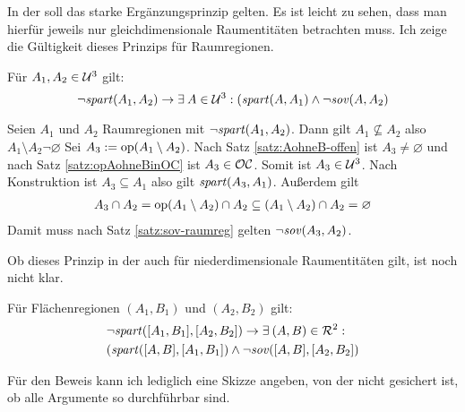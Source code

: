     In der \strukt soll das starke Ergänzungsprinzip gelten. 
    Es ist leicht zu sehen, dass man hierfür jeweils nur gleichdimensionale Raumentitäten betrachten muss.
    Ich zeige die Gültigkeit dieses Prinzips für Raumregionen.
    \begin{satz}
        Für $A_1,A_2 \in \mathcal{U}^3$ gilt: 
        $$\neg \mathit{spart}(A_1,A_2) \to \exists\: A \in  \mathcal{U}^3: (\mathit{spart}(A,A_1) \wedge \neg \mathit{sov}(A,A_2)$$
    \end{satz}
    \begin{bew}
        Seien $A_1$ und $A_2$ Raumregionen mit $\neg \mathit{spart}(A_1,A_2)$.
        Dann gilt $A_1 \nsubseteq A_2$ also $A_1 \setminus A_2 \neg \varnothing$
        Sei $A_3 := \text{op}(A_1 \setminus A_2)$.
        Nach Satz \ref{satz:AohneB-offen} ist $A_3 \neq \varnothing$ und nach Satz \ref{satz:opAohneBinOC} ist $A_3 \in \mathcal{OC}$.
        Somit ist $A_3 \in \mathcal{U}^3$.
        Nach Konstruktion ist $A_3 \subseteq A_1$ also gilt $\mathit{spart}(A_3,A_1)$.
        Außerdem gilt
        \begin{align*}
            A_3 \cap A_2 
            = \text{op}(A_1 \setminus A_2) \cap A_2 
            \subseteq (A_1 \setminus A_2) \cap A_2 
            = \varnothing
        \end{align*}
        Damit muss nach Satz \ref{satz:sov-raumreg} gelten $\neg \mathit{sov}(A_3,A_2)$.
    \end{bew}
    Ob dieses Prinzip in der \strukt auch für niederdimensionale Raumentitäten gilt, ist noch nicht klar.
    \begin{hyp}
        Für Flächenregionen $(A_1,B_1)$ und $(A_2,B_2)$ gilt: 
        \begin{align*}
            &\neg \mathit{spart}([A_1,B_1],[A_2,B_2]) \to \exists\: (A,B) \in  \mathcal{R}^2:\\
            &(\mathit{spart}([A,B],[A_1,B_1]) \wedge \neg \mathit{sov}([A,B],[A_2,B_2])
        \end{align*}
    \end{hyp}
    Für den Beweis kann ich lediglich eine Skizze angeben, von der nicht gesichert ist, ob alle Argumente so durchführbar sind.
